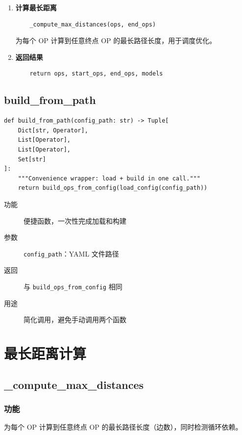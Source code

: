 \documentclass[12pt,a4paper]{article}
\begin{document}
\begin{enumerate}
    \item \textbf{计算最长距离}
    \begin{lstlisting}
    _compute_max_distances(ops, end_ops)
    \end{lstlisting}
    为每个 OP 计算到任意终点 OP 的最长路径长度，用于调度优化。
    
    \item \textbf{返回结果}
    \begin{lstlisting}
    return ops, start_ops, end_ops, models
    \end{lstlisting}
\end{enumerate}

\subsection{build\_from\_path}

\begin{lstlisting}
def build_from_path(config_path: str) -> Tuple[
    Dict[str, Operator],
    List[Operator],
    List[Operator],
    Set[str]
]:
    """Convenience wrapper: load + build in one call."""
    return build_ops_from_config(load_config(config_path))
\end{lstlisting}

\begin{description}
    \item[功能] 便捷函数，一次性完成加载和构建
    \item[参数] \texttt{config_path}：YAML 文件路径
    \item[返回] 与 \texttt{build\_ops\_from\_config} 相同
    \item[用途] 简化调用，避免手动调用两个函数
\end{description}

\section{最长距离计算}

\subsection{\_compute\_max\_distances}

\subsubsection{功能}

为每个 OP 计算到任意终点 OP 的最长路径长度（边数），同时检测循环依赖。
\end{document}
